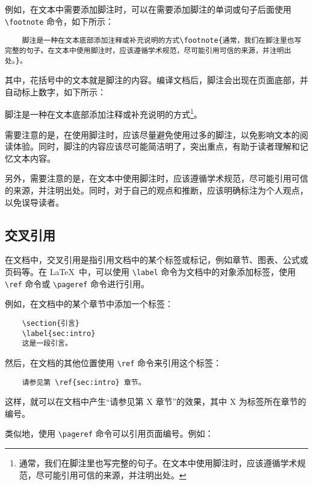 例如，在文本中需要添加脚注时，可以在需要添加脚注的单词或句子后面使用 \verb|\footnote| 命令，如下所示：

\begin{Verbatim}
    脚注是一种在文本底部添加注释或补充说明的方式\footnote{通常，我们在脚注里也写完整的句子。在文本中使用脚注时，应该遵循学术规范，尽可能引用可信的来源，并注明出处。}。
\end{Verbatim}

其中，花括号中的文本就是脚注的内容。编译文档后，脚注会出现在页面底部，并自动标上数字，如下所示：

脚注是一种在文本底部添加注释或补充说明的方式\footnote{通常，我们在脚注里也写完整的句子。在文本中使用脚注时，应该遵循学术规范，尽可能引用可信的来源，并注明出处。}。

需要注意的是，在使用脚注时，应该尽量避免使用过多的脚注，以免影响文本的阅读体验。同时，脚注的内容应该尽可能简洁明了，突出重点，有助于读者理解和记忆文本内容。

另外，需要注意的是，在文本中使用脚注时，应该遵循学术规范，尽可能引用可信的来源，并注明出处。同时，对于自己的观点和推断，应该明确标注为个人观点，以免误导读者。

\subsection{交叉引用}

在文档中，交叉引用是指引用文档中的某个标签或标记，例如章节、图表、公式或页码等。在 \LaTeX\ 中，可以使用 \verb|\label| 命令为文档中的对象添加标签，使用 \verb|\ref| 命令或 \verb|\pageref| 命令进行引用。

例如，在文档中的某个章节中添加一个标签：

\begin{Verbatim}
    \section{引言}
    \label{sec:intro}
    这是一段引言。
\end{Verbatim}

然后，在文档的其他位置使用 \verb|\ref| 命令来引用这个标签：

\begin{Verbatim}
    请参见第 \ref{sec:intro} 章节。
\end{Verbatim}

这样，就可以在文档中产生“请参见第 X 章节”的效果，其中 X 为标签所在章节的编号。

类似地，使用 \verb|\pageref| 命令可以引用页面编号。例如：

